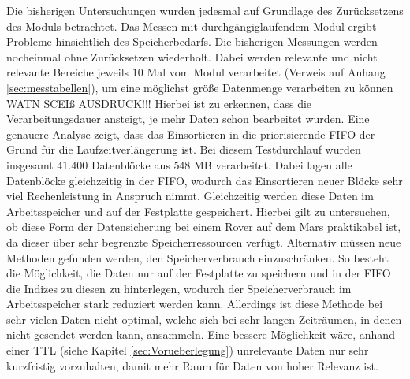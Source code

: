 Die bisherigen Untersuchungen wurden jedesmal auf Grundlage des Zurücksetzens
des Moduls betrachtet. Das Messen mit durchgängiglaufendem Modul ergibt Probleme
hinsichtlich des Speicherbedarfs. 
\newline
Die bisherigen Messungen werden nocheinmal ohne Zurücksetzen wiederholt. Dabei
werden relevante und nicht relevante Bereiche jeweils $10$ Mal vom Modul
verarbeitet (Verweis auf Anhang \ref{sec:messtabellen}), um eine möglichst größe
Datenmenge verarbeiten zu können WATN SCEIß AUSDRUCK!!!
\newline
Hierbei ist zu
erkennen, dass die Verarbeitungsdauer ansteigt, je mehr Daten schon bearbeitet
wurden. Eine genauere Analyse zeigt, dass das Einsortieren in die priorisierende
\gls{FIFO} der Grund für die Laufzeitverlängerung ist. Bei diesem Testdurchlauf
wurden insgesamt $41.400$ Datenblöcke aus $548$ MB verarbeitet.
Dabei lagen alle Datenblöcke gleichzeitig in der \gls{FIFO}, wodurch das
Einsortieren neuer Blöcke sehr viel Rechenleistung in Anspruch nimmt.
Gleichzeitig werden diese Daten im Arbeitsspeicher und auf der Festplatte
gespeichert. Hierbei gilt zu untersuchen, ob diese Form der Datensicherung bei
einem Rover auf dem Mars praktikabel ist, da dieser über sehr begrenzte
Speicherressourcen verfügt. Alternativ müssen neue Methoden gefunden werden, den
Speicherverbrauch einzuschränken. So besteht die Möglichkeit, die Daten nur auf
der Festplatte zu speichern und in der \gls{FIFO} die Indizes zu diesen zu
hinterlegen, wodurch der Speicherverbrauch im Arbeitsspeicher stark reduziert
werden kann. Allerdings ist diese Methode bei sehr vielen Daten nicht optimal,
welche sich bei sehr langen Zeiträumen, in denen nicht gesendet werden kann,
ansammeln. Eine bessere Möglichkeit wäre, anhand einer \gls{TTL} (siehe Kapitel
\ref{sec:Vorueberlegung}) unrelevante Daten nur sehr kurzfristig vorzuhalten,
damit mehr Raum für Daten von hoher Relevanz ist.



 


